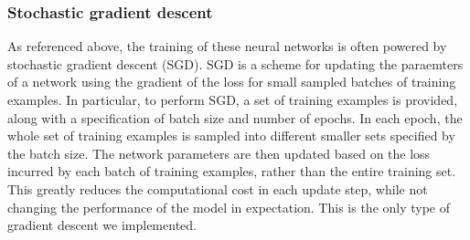 \subsubsection{Stochastic gradient descent}
As referenced above, the training of these neural networks is often powered by stochastic gradient descent (SGD).
SGD is a scheme for updating the paraemters of a network using the gradient of the loss for small sampled batches of training examples.
In particular, to perform SGD, a set of training examples is provided, along with a specification of batch size and number of epochs.
In each epoch, the whole set of training examples is sampled into different smaller sets specified by the batch size.
The network parameters are then updated based on the loss incurred by each batch of training examples, rather than the entire training set.
This greatly reduces the computational cost in each update step, while not changing the performance of the model in expectation.
This is the only type of gradient descent we implemented.





